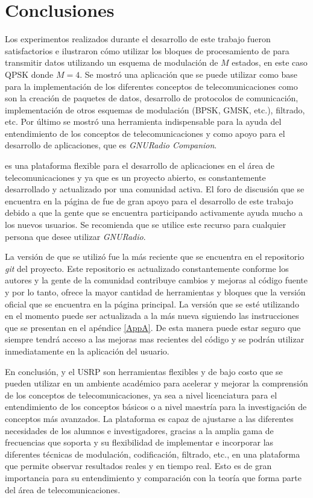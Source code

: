 \chapter{Conclusiones}
Los experimentos realizados durante el desarrollo de este trabajo fueron satisfactorios e ilustraron c\'omo utilizar los bloques
de procesamiento de \gnuradio para transmitir datos utilizando un esquema de modulaci\'on de $M$ estados, en este caso QPSK donde
$M=4$. Se mostr\'o una aplicaci\'on que se puede utilizar como base para la implementaci\'on de los diferentes conceptos de
telecomunicaciones como son la creaci\'on de paquetes de datos, desarrollo de protocolos de comunicaci\'on, implementaci\'on de
otros esquemas de modulaci\'on (BPSK, GMSK, etc.), filtrado, etc. Por \'ultimo se mostr\'o una herramienta indispensable para la
ayuda del entendimiento de los conceptos de telecomunicaciones y como apoyo para el desarrollo de aplicaciones, que es
\emph{GNURadio Companion}.

\gnuradio es una plataforma flexible para el desarrollo de aplicaciones en el \'area de telecomunicaciones y ya que es
un proyecto abierto, es constantemente desarrollado y actualizado por una comunidad activa. El foro de discusi\'on que se
encuentra en la p\'agina de \gnuradio \cite{radio} fue de gran apoyo para el desarrollo de este trabajo debido a que la gente que
se encuentra participando activamente ayuda mucho a los nuevos usuarios. Se recomienda que se utilice este
recurso para cualquier persona que desee utilizar \emph{GNURadio}.

La versi\'on de \gnuradio que se utiliz\'o fue la m\'as reciente que se encuentra en el repositorio \emph{git} del proyecto. Este
repositorio es actualizado constantemente conforme los autores y la gente de la comunidad contribuye cambios y mejoras al c\'odigo
fuente y por lo tanto, ofrece la mayor cantidad de herramientas y bloques que la versi\'on oficial que se encuentra en la p\'agina
principal. La versi\'on que se est\'e utilizando en el momento puede ser actualizada a la m\'as nueva siguiendo las instrucciones
que se presentan en el ap\'endice \ref{AppA}. De esta manera puede estar seguro que siempre tendr\'a acceso a las mejoras mas
recientes del c\'odigo y se podr\'an utilizar inmediatamente en la aplicaci\'on del usuario.

En conclusi\'on, \gnuradio y el USRP son herramientas flexibles y de bajo costo que se pueden utilizar en un ambiente acad\'emico
para acelerar y mejorar la comprensi\'on de los conceptos de telecomunicaciones, ya sea a nivel licenciatura para el entendimiento
de los conceptos b\'asicos o a nivel maestr\'ia para la investigaci\'on de conceptos m\'as avanzados. La plataforma es capaz de
ajustarse a las diferentes necesidades de los alumnos e investigadores, gracias a la amplia gama de frecuencias que soporta y su
flexibilidad de implementar e incorporar las diferentes t\'ecnicas de modulaci\'on, codificaci\'on, filtrado, etc., en una
plataforma que permite observar resultados reales y en tiempo real. Esto es de gran importancia para su entendimiento y
comparaci\'on con la teor\'ia que forma parte del \'area de telecomunicaciones.

